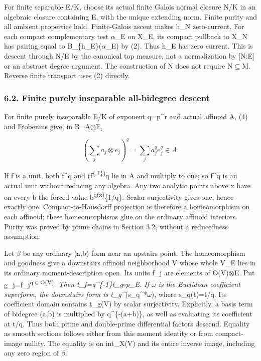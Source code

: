 \documentclass[
  10pt,
]{article}
\begin{document}
For finite separable E/K, choose its actual finite Galois normal closure
N/K in an algebraic closure containing E, with the unique extending
norm. Finite purity and all ambient properties hold. Finite-Galois
ascent makes h\_N zero-current. For each compact complementary test \ensuremath{\alpha}\_E
on X\_E, its compact pullback to X\_N has pairing equal to
B\_\{h\_E\}(\ensuremath{\alpha}\_E) by (2). Thus h\_E has zero current. This is descent
through N/E by the canonical top measure, not a normalization by
{[}N:E{]} or an abstract degree argument. The construction of N does not
require N\ensuremath{\subseteq}M. Reverse finite transport uses (2) directly.

\subsubsection{6.2. Finite purely inseparable all-bidegree
descent}\label{finite-purely-inseparable-all-bidegree-descent}

For finite purely inseparable E/K of exponent q=p\^{}r and actual
affinoid A, (4) and Frobenius give, in B=A\ensuremath{\otimes}E,

\[
       (\sum_j a_j\otimes e_j)^q=\sum_j a_j^q e_j^q\in A.    \tag{13}
\]

If f is a unit, both f\^{}q and (f\textsuperscript{\{-1\})}q lie in A
and multiply to one; so f\^{}q is an actual unit without reducing any
algebra. Any two analytic points above x have on every b the forced
value \textbar b\textsuperscript{q(x)\textbar{}}\{1/q\}. Scalar
surjectivity gives one, hence exactly one. Compact-to-Hausdorff
projection is therefore a homeomorphism on each affinoid; these
homeomorphisms glue on the ordinary affinoid interiors. Purity was
proved by prime chains in Section 3.2, without a reducedness assumption.

Let \ensuremath{\beta} be any ordinary (a,b) form near an upstairs point. The
homeomorphism and goodness give a downstairs affinoid neighborhood V
whose whole V\_E lies in its ordinary moment-description open. Its units
f\_j are elements of O(V)\ensuremath{\otimes}E. Put
g\_j=f\_j\textsuperscript{q\ensuremath{\in}O(V)}\emph{. Then t\_f=q\^{}\{-1\}t\_g\ensuremath{\circ}p\_E.
If \ensuremath{\omega} is the Euclidean coefficient superform, the downstairs form is
t\_g\^{}}(s\_q\^{}*\ensuremath{\omega}), where s\_q(t)=t/q. Its coefficient domain
contains t\_g(V) by scalar surjectivity. Explicitly, a basis term of
bidegree (a,b) is multiplied by q\^{}\{-(a+b)\}, as well as evaluating
its coefficient at t/q. Thus both prime and double-prime differential
factors descend. Equality as smooth sections follows either from this
moment identity or from compact-image nullity. The equality is on
int\_X(V) and its entire inverse image, including any zero region of \ensuremath{\beta}.
\end{document}
